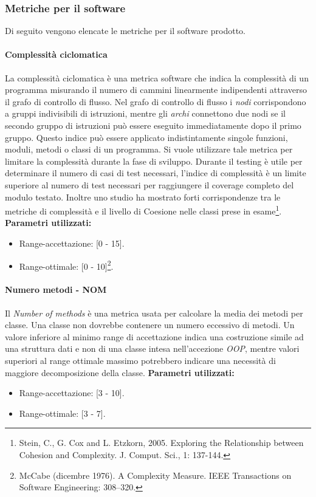 		\subsubsection{Metriche per il software}
		Di seguito vengono elencate le metriche per il software prodotto.		
		
			\paragraph{Complessità ciclomatica}
			La complessità ciclomatica è una metrica software che indica la complessità di un programma misurando il numero di cammini linearmente indipendenti attraverso il grafo di controllo di flusso. Nel grafo di controllo di flusso i \emph{nodi} corrispondono a gruppi indivisibili di istruzioni, mentre gli \emph{archi} connettono due nodi se il secondo gruppo di istruzioni può essere eseguito immediatamente dopo il primo gruppo.
			Questo indice può essere applicato indistintamente singole funzioni, moduli, metodi o classi di un programma.
			Si vuole utilizzare tale metrica per limitare la complessità durante la fase di sviluppo.
			Durante il testing è utile per determinare il numero di casi di test necessari, l'indice di complessità è un limite superiore al numero di test necessari per raggiungere il coverage completo del modulo testato. Inoltre uno studio ha mostrato forti corrispondenze tra le metriche di complessità e il livello di Coesione nelle classi prese in esame\footnote{Stein, C., G. Cox and L. Etzkorn, 2005. Exploring the Relationship between Cohesion and Complexity. J. Comput. Sci., 1: 137-144.}.\\
		\textbf{Parametri utilizzati:}
			\begin{itemize}
				\item Range-accettazione: [0 - 15].
				\item Range-ottimale: [0 - 10]\footnote{McCabe (dicembre 1976). A Complexity Measure. IEEE Transactions on Software Engineering: 308–320.}.
			\end{itemize}
			
			\paragraph{Numero metodi - NOM}
			Il \emph{Number of methods} è una metrica usata per calcolare la media dei metodi per classe. Una classe non dovrebbe contenere un numero eccessivo di metodi. Un valore inferiore al minimo range di accettazione indica una costruzione simile ad una struttura dati e non di una classe intesa nell'accezione \emph{OOP}, mentre valori superiori al range ottimale massimo potrebbero indicare una necessità di maggiore decomposizione della classe.
			\textbf{Parametri utilizzati:}
			\begin{itemize}
				\item Range-accettazione: [3 - 10].
				\item Range-ottimale: [3 - 7].
			\end{itemize}
			
